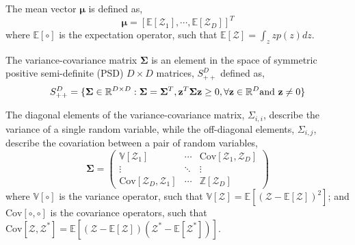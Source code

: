 The mean vector $\boldsymbol{\mu}$ is defined as,
\begin{equation}
	\boldsymbol{\mu} = [\mathbb{E}[\mathcal{Z}_1], \cdots, \mathbb{E}[\mathcal{Z}_D]]^T
\label{eq:mean_vector}
\end{equation}
where $\mathbb{E}[\circ]$ is the expectation operator, such that $\mathbb{E}[\mathcal{Z}] = \int_z z p(z) dz$.

The variance-covariance matrix $\boldsymbol{\Sigma}$ is an element in the space of symmetric positive semi-definite (PSD) $D \times D$ matrices, $S_{++}^D$ defined as,
\begin{equation}
	S_{++}^D = \{\boldsymbol{\Sigma} \in \mathbb{R}^{D\times D}: \boldsymbol{\Sigma} = \boldsymbol{\Sigma}^T, \mathbf{z}^T \boldsymbol{\Sigma} \mathbf{z} \geq 0, \forall \mathbf{z} \in \mathbb{R}^D \textnormal{and } \mathbf{z} \neq 0 \}
	\label{eq:def_covariance_matrix}
\end{equation}

The diagonal elements of the variance-covariance matrix, $\Sigma_{i,i}$, describe the variance of a single random variable,
while the off-diagonal elements, $\Sigma_{i,j}$, describe the covariation between a pair of random variables,
\begin{equation}
	\boldsymbol{\Sigma} =
	\begin{pmatrix}
			\mathbb{V}[\mathcal{Z}_1] 							 & \cdots		& \text{Cov}[\mathcal{Z}_1, \mathcal{Z}_D] \\
			\vdots                   								 & \ddots   & \vdots \\
			\text{Cov}[\mathcal{Z}_D, \mathcal{Z}_1] & \cdots 	& \mathbb{Z}[\mathcal{Z}_D]
	\end{pmatrix}
\label{eq:covariance_matrix}
\end{equation}
where $\mathbb{V} [\circ]$ is the variance operator, such that $\mathbb{V} [\mathcal{Z}] = \mathbb{E}[(\mathcal{Z} - \mathbb{E}[\mathcal{Z}])^2]$;
and $\text{Cov} [\circ, \circ]$ is the covariance operators, such that $\text{Cov} [\mathcal{Z}, \mathcal{Z}^*] = \mathbb{E}[(\mathcal{Z}-\mathbb{E}[\mathcal{Z}])(\mathcal{Z}^*-\mathbb{E}[\mathcal{Z}^*])]$.

